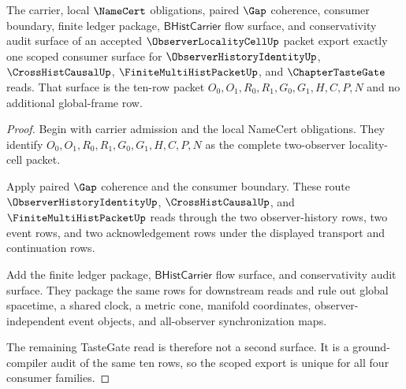 \begin{theorem}
\label{thm:observer-locality-cell-scoped-export-surface}
The carrier, local $\NameCert$ obligations, paired $\Gap$ coherence, consumer boundary, finite ledger package, $\mathsf{BHistCarrier}$ flow surface, and conservativity audit surface of an accepted $\ObserverLocalityCellUp$ packet export exactly one scoped consumer surface for $\ObserverHistoryIdentityUp$, $\CrossHistCausalUp$, $\FiniteMultiHistPacketUp$, and $\ChapterTasteGate$ reads. That surface is the ten-row packet $O_0,O_1,R_0,R_1,G_0,G_1,H,C,P,N$ and no additional global-frame row.
\end{theorem}
\begin{proof}
Begin with carrier admission and the local NameCert obligations. They identify $O_0,O_1,R_0,R_1,G_0,G_1,H,C,P,N$ as the complete two-observer locality-cell packet.

Apply paired $\Gap$ coherence and the consumer boundary. These route $\ObserverHistoryIdentityUp$, $\CrossHistCausalUp$, and $\FiniteMultiHistPacketUp$ reads through the two observer-history rows, two event rows, and two acknowledgement rows under the displayed transport and continuation rows.

Add the finite ledger package, $\mathsf{BHistCarrier}$ flow surface, and conservativity audit surface. They package the same rows for downstream reads and rule out global spacetime, a shared clock, a metric cone, manifold coordinates, observer-independent event objects, and all-observer synchronization maps.

The remaining TasteGate read is therefore not a second surface. It is a ground-compiler audit of the same ten rows, so the scoped export is unique for all four consumer families.
\end{proof}

